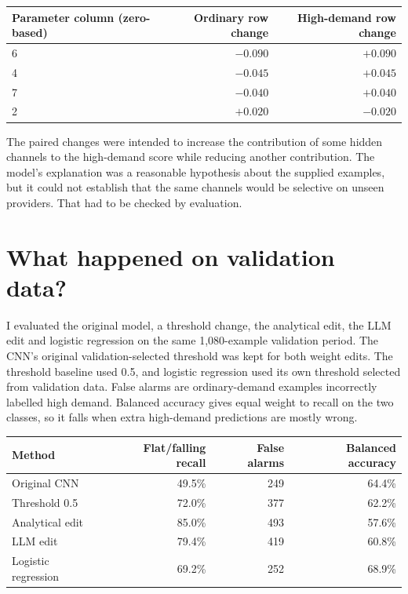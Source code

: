 \documentclass[11pt,a4paper]{article}
\begin{document}
\begin{center}
\small
\begin{tabular}{@{}lrr@{}}
\toprule
Parameter column (zero-based) & Ordinary row change & High-demand row change \\
\midrule
6 & $-0.090$ & $+0.090$ \\
4 & $-0.045$ & $+0.045$ \\
7 & $-0.040$ & $+0.040$ \\
2 & $+0.020$ & $-0.020$ \\
\bottomrule
\end{tabular}
\end{center}

The paired changes were intended to increase the contribution of some hidden channels to the high-demand score while reducing another contribution. The model's explanation was a reasonable hypothesis about the supplied examples, but it could not establish that the same channels would be selective on unseen providers. That had to be checked by evaluation.

\section*{What happened on validation data?}
I evaluated the original model, a threshold change, the analytical edit, the LLM edit and logistic regression on the same 1,080-example validation period. The CNN's original validation-selected threshold was kept for both weight edits. The threshold baseline used 0.5, and logistic regression used its own threshold selected from validation data. False alarms are ordinary-demand examples incorrectly labelled high demand. Balanced accuracy gives equal weight to recall on the two classes, so it falls when extra high-demand predictions are mostly wrong.

\begin{center}
\small
\begin{tabular}{@{}lrrr@{}}
\toprule
Method & Flat/falling recall & False alarms & Balanced accuracy \\
\midrule
Original CNN & 49.5\% & 249 & 64.4\% \\
Threshold 0.5 & 72.0\% & 377 & 62.2\% \\
Analytical edit & 85.0\% & 493 & 57.6\% \\
LLM edit & 79.4\% & 419 & 60.8\% \\
Logistic regression & 69.2\% & 252 & 68.9\% \\
\bottomrule
\end{tabular}
\end{center}
\end{document}
